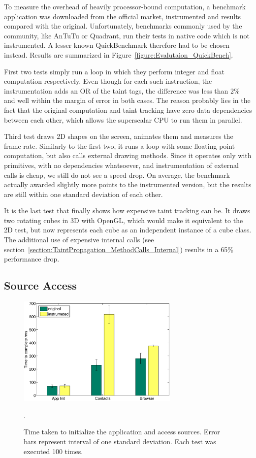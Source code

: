 \documentclass[12pt,twoside,notitlepage]{report}
\begin{document}
To measure the overhead of heavily processor-bound computation, a benchmark application was downloaded from the official market, instrumented and results compared with the original. Unfortunately, benchmarks commonly used by the community, like AnTuTu or Quadrant, run their tests in native code which is not instrumented. A lesser known QuickBenchmark therefore had to be chosen instead. Results are summarized in Figure~\ref{figure:Evalutaion_QuickBench}. 

First two tests simply run a loop in which they perform integer and float computation respectively. Even though for each such instruction, the instrumentation adds an OR of the taint tags, the difference was less than 2\% and well within the margin of error in both cases. The reason probably lies in the fact that the original computation and taint tracking have zero data dependencies between each other, which allows the superscalar CPU to run them in parallel.

Third test draws 2D shapes on the screen, animates them and measures the frame rate. Similarly to the first two, it runs a loop with some floating point computation, but also calls external drawing methods. Since it operates only with primitives, with no dependencies whatsoever, and instrumentation of external calls is cheap, we still do not see a speed drop. On average, the benchmark actually awarded slightly more points to the instrumented version, but the results are still within one standard deviation of each other. 

It is the last test that finally shows how expensive taint tracking can be. It draws two rotating cubes in 3D with OpenGL, which would make it equivalent to the 2D test, but now represents each cube as an independent instance of a cube class. The additional use of expensive internal calls (see section~\ref{section:TaintPropagation_MethodCalls_Internal}) results in a 65\% performance drop.

\subsection{Source Access}

\begin{figure}
	\centerline{	
		\includegraphics[width=0.7\textwidth]{figs/fig_eval_testappbench.eps}
	}
	\caption{Time taken to initialize the application and access sources. Error bars represent interval of one standard deviation. Each test was executed 100 times.}.
	\label{figure:Evalutaion_TestAppBench}
\end{figure}
\end{document}
